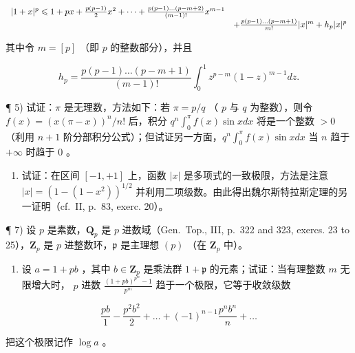 \[
\begin{array}{r l} | 1 + x | ^ {p} \leqslant 1 + p x + \frac {p (p - 1)}{2} x ^ {2} + \dots + \frac {p (p - 1) \dots (p - m + 2)}{(m - 1) !} x ^ {m - 1} \\ & + \frac {p (p - 1) \dots (p - m + 1)}{m !} | x | ^ {m} + h _ {p} | x | ^ {p} \end{array}
\]

其中令 \(m = [p]\) （即 \(p\) 的整数部分），并且

\[
h _ {p} = \frac {p (p - 1) \dots (p - m + 1)}{(m - 1) !} \int_ {0} ^ {1} z ^ {p - m} (1 - z) ^ {m - 1} d z.
\]

¶ 5) 试证：\(\pi\) 是无理数，方法如下：若 \(\pi = p/q\) （ \(p\) 与 \(q\) 为整数），则令 \(f(x) = (x(\pi - x))^n / n!\) 后，积分 \(q^n \int_0^\pi f(x) \sin x dx\) 将是一个整数 \(>0\) （利用 \(n + 1\) 阶分部积分公式）；但试证另一方面，\(q^n \int_0^\pi f(x) \sin x dx\) 当 \(n\) 趋于 \(+\infty\) 时趋于 0 。

\begin{enumerate}
\def\labelenumi{\arabic{enumi})}
\setcounter{enumi}{5}
\tightlist
\item
  试证：在区间 \([-1,+1]\) 上，函数 \(|x|\) 是多项式的一致极限，方法是注意 \(|x|=(1-(1-x^{2}))^{1/2}\) 并利用二项级数。由此得出魏尔斯特拉斯定理的另一证明（cf.~II, p.~83, exerc. 20）。
\end{enumerate}

¶ 7) 设 \(p\) 是素数，\(\mathbf{Q}_p\) 是 \(p\) 进数域（Gen.~Top., III, p.~322 and 323, exercs. 23 to 25），\(\mathbf{Z}_p\) 是 \(p\) 进整数环，\(\mathfrak{p}\) 是主理想 \((p)\) （在 \(\mathbf{Z}_p\) 中）。

\begin{enumerate}
\def\labelenumi{\alph{enumi})}
\tightlist
\item
  设 \(a = 1 + pb\) ，其中 \(b \in \mathbf{Z}_p\) 是乘法群 \(1 + \mathfrak{p}\) 的元素；试证：当有理整数 \(m\) 无限增大时， \(p\) 进数 \(\frac{(1 + pb)^{p^m} - 1}{p^m}\) 趋于一个极限，它等于收敛级数
\end{enumerate}

\[
\frac {p b}{1} - \frac {p ^ {2} b ^ {2}}{2} + \dots + (- 1) ^ {n - 1} \frac {p ^ {n} b ^ {n}}{n} + \dots
\]

把这个极限记作 \(\log a\) 。


